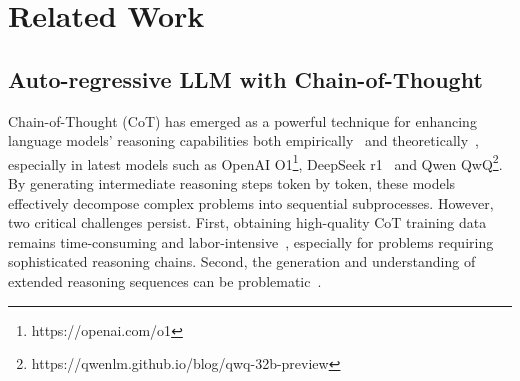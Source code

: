 \section{Related Work}

\subsection{Auto-regressive LLM with Chain-of-Thought}

Chain-of-Thought (CoT) has emerged as a powerful technique for enhancing language models' reasoning capabilities both empirically~\cite{wei2022chain,khot2022decomposed} and theoretically~\cite{feng2024towards,merrill2024the}, especially in latest models such as OpenAI O1\footnote{https://openai.com/o1}, DeepSeek r1~\cite{deepseekai2025deepseekr1} and Qwen QwQ\footnote{https://qwenlm.github.io/blog/qwq-32b-preview}. By generating intermediate reasoning steps token by token, these models effectively decompose complex problems into sequential subprocesses. However, two critical challenges persist. First, obtaining high-quality CoT training data remains time-consuming and labor-intensive~\cite{lightman2024lets}, especially for problems requiring sophisticated reasoning chains. Second, the generation and understanding of extended reasoning sequences can be problematic~\cite{xiao2023conditions,jin-etal-2024-impact,mao2024lift}.

